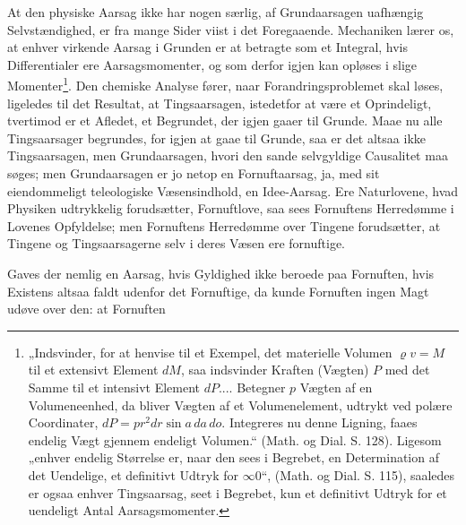 \documentclass[12pt,a4paper]{book}
\begin{document}
\setcounter{footnote}{0}
At den physiske Aarsag ikke har nogen særlig, af Grundaarsagen uafhængig
Selvstændighed, er fra mange Sider viist i det Foregaaende. Mechaniken lærer
os, at enhver virkende Aarsag i Grunden er at betragte som et Integral, hvis
Differentialer ere Aarsagsmomenter, og som derfor igjen kan opløses i slige
Momenter\footnote{„Indsvinder, for at henvise til et Exempel, det materielle
Volumen $\varrho v = M$ til et extensivt Element $dM$, saa indsvinder Kraften
(Vægten) $P$ med det Samme til et intensivt Element $dP$.... Betegner $p$
Vægten af en Volumeneenhed, da bliver Vægten af et Volumenelement, udtrykt ved
polære Coordinater, $dP = pr^2 dr \sin a\, da\, do$. Integreres nu denne
Ligning, faaes endelig Vægt gjennem endeligt Volumen.“ (Math. og Dial. S. 128).
Ligesom „enhver endelig Størrelse er, naar den sees i Begrebet, en
Determination af det Uendelige, et definitivt Udtryk for $\infty 0$“, (Math. og
Dial. S. 115), saaledes er ogsaa enhver Tingsaarsag, seet i Begrebet, kun et
definitivt Udtryk for et uendeligt Antal Aarsagsmomenter.}. Den chemiske
Analyse fører, naar Forandringsproblemet skal løses, ligeledes til det
Resultat, at Tingsaarsagen, istedetfor at være et Oprindeligt, tvertimod er et
Afledet, et Begrundet, der igjen gaaer til Grunde. Maae nu alle Tingsaarsager
begrundes, for igjen at gaae til Grunde, saa er det altsaa ikke Tingsaarsagen,
men Grundaarsagen, hvori den sande selvgyldige Causalitet maa søges; men
Grundaarsagen er jo netop en Fornuftaarsag, ja, med sit eiendommeligt
teleologiske Væsensindhold, en Idee-Aarsag. Ere Naturlovene, hvad Physiken
udtrykkelig forudsætter, Fornuftlove, saa sees Fornuftens Herredømme i Lovenes
Opfyldelse; men Fornuftens Herredømme over Tingene forudsætter, at Tingene og
Tingsaarsagerne selv i deres Væsen ere fornuftige.

Gaves der nemlig en Aarsag, hvis Gyldighed ikke beroede paa Fornuften, hvis
Existens altsaa faldt udenfor det Fornuftige, da kunde Fornuften ingen Magt
udøve over den: at Fornuften
\end{document}
